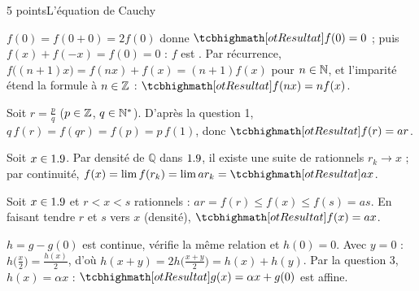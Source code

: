 \begin{corrigeEval}{5 points}{L'équation de Cauchy}
\begin{questions}
  \item $f(0)=f(0+0)=2f(0)$ donne $\res{f(0)=0}$ ; puis
    $f(x)+f(-x)=f(0)=0$ : $f$ est . Par récurrence,
    $f\bigl((n+1)x\bigr)=f(nx)+f(x)=(n+1)f(x)$ pour $n\in\mathbb{N}$, et l'imparité
    étend la formule à $n\in\mathbb{Z}$ : $\res{f(nx)=nf(x)}$. \pts{1 pt}
  \item Soit $r=\frac pq$ ($p\in\mathbb{Z}$, $q\in\mathbb{N}^{*}$). D'après la question 1,
    $q\,f(r)=f(qr)=f(p)=p\,f(1)$, donc $\res{f(r)=ar}$. \pts{1 pt}
  \item Soit $x\in1.9$. Par densité de $\mathbb{Q}$ dans $1.9$, il existe une
    suite de rationnels $r_k\to x$ ; par continuité,
    $f(x)=\lim f(r_k)=\lim ar_k=\res{ax}$. \pts{1 pt}
  \item Soit $x\in1.9$ et $r<x<s$ rationnels : $ar=f(r)\leqslant f(x)\leqslant f(s)=as$.
    En faisant tendre $r$ et $s$ vers $x$ (densité), $\res{f(x)=ax}$.
    \pts{1 pt}
  \item $h=g-g(0)$ est continue, vérifie la même relation et $h(0)=0$. Avec
    $y=0$ : $h\bigl(\frac x2\bigr)=\frac{h(x)}2$, d'où
    $h(x+y)=2h\bigl(\frac{x+y}{2}\bigr)=h(x)+h(y)$. Par la question 3,
    $h(x)=\alpha x$ : $\res{g(x)=\alpha x+g(0)}$ est affine. \pts{1 pt}
\end{questions}
\end{corrigeEval}
